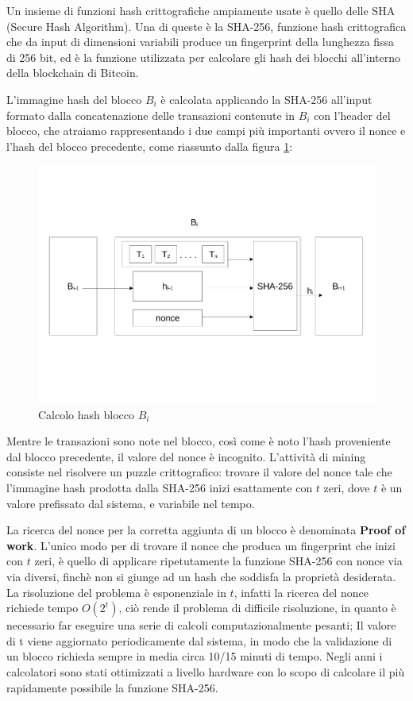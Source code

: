 Un insieme di funzioni hash crittografiche ampiamente usate è quello delle SHA (Secure Hash Algorithm). Una di queste è la SHA-256, funzione hash crittografica che da input di dimensioni variabili produce un fingerprint della lunghezza fissa di 256 bit, ed è la funzione utilizzata per calcolare gli hash dei blocchi all’interno della blockchain di Bitcoin.

L’immagine hash del blocco $B_i$ è calcolata applicando la SHA-256 all’input formato dalla concatenazione delle transazioni contenute in $B_i$ con l'header del blocco, che atraiamo rappresentando i due campi più importanti ovvero il nonce e l'hash del blocco precedente, come riassunto dalla figura \ref{fig:sha-256}:
\begin{figure}[h!]
    \centering
    \includegraphics[scale=0.4, trim = 1cm 4cm 0cm 4cm, clip]{Images/blocchi_sha.pdf}
    \caption{Calcolo hash blocco $B_i$}
    \label{fig:sha-256}
\end{figure}
\FloatBarrier
Mentre le transazioni sono note nel blocco, così come è noto l’hash proveniente dal blocco precedente, il valore del nonce è incognito. L’attività di mining consiste nel risolvere un puzzle crittografico: trovare il valore del nonce tale che l’immagine hash prodotta dalla SHA-256 inizi esattamente con $t$ zeri, dove $t$ è un valore prefissato dal sistema, e variabile nel tempo.

La ricerca del nonce per la corretta aggiunta di un blocco è denominata \textbf{Proof of work}. L'unico modo per di trovare il nonce che produca un fingerprint che inizi con $t$ zeri, è quello di applicare ripetutamente la funzione SHA-256 con nonce via via diversi, finchè non si giunge ad un hash che soddisfa la proprietà desiderata. La risoluzione del problema è esponenziale in $t$, infatti la ricerca del nonce richiede tempo $O(2^t)$, ciò rende il problema di difficile risoluzione, in quanto è necessario far eseguire una serie di calcoli computazionalmente pesanti; Il valore di t viene aggiornato periodicamente dal sistema, in modo che la validazione di un blocco richieda sempre in media circa 10/15 minuti di tempo. Negli anni i calcolatori sono stati ottimizzati a livello hardware con lo scopo di calcolare il più rapidamente possibile la funzione SHA-256.

